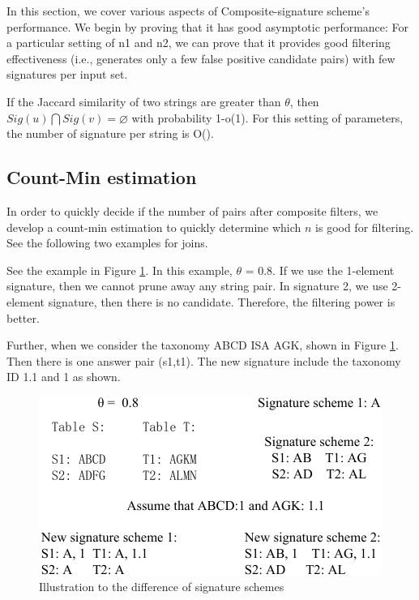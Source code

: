 In this section, we cover various aspects of Composite-signature scheme's performance.
We begin by proving that it has good asymptotic performance: For a particular setting of n1 and n2, we can prove
that it provides good filtering effectiveness (i.e., generates only a few false positive candidate pairs) with few signatures per input set.

\begin{theorem} If the Jaccard similarity of two strings are greater than $\theta$, then $Sig(u) \bigcap Sig(v) = \varnothing$ with probability 1-o(1). For this setting of parameters, the number of signature per string is O().
\end{theorem}

\subsection{Count-Min estimation}

In order to quickly decide if the number of pairs after composite filters, we develop a count-min estimation to quickly determine which $n$ is good for filtering. See the following two examples for joins.

See the example in Figure \ref{fig:signature_example1}. In this example, $\theta$ = 0.8. If we use the 1-element signature, then we cannot prune away any string pair. In signature 2, we use 2-element signature, then there is no candidate. Therefore, the filtering power is better.

Further, when we consider the taxonomy ABCD ISA AGK, shown in Figure \ref{fig:signature_example1}. Then there is one answer pair (s1,t1). The new signature include the taxonomy ID 1.1 and 1  as shown.

\begin{figure}[h]
\centering
\includegraphics[scale=0.8]{figures/signature_example1}
 \caption{Illustration to the difference of signature schemes}
\label{fig:signature_example1}
\end{figure}

